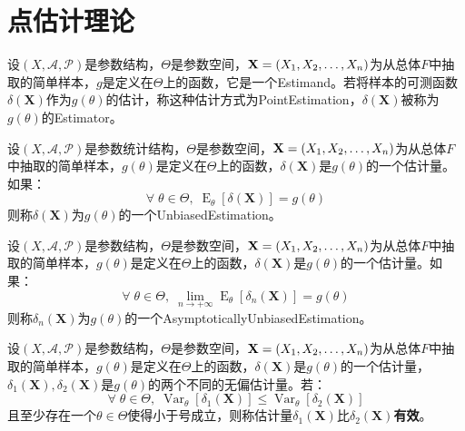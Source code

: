 \chapter{点估计理论}

\begin{definition}
	设$(X,\mathscr{A},\mathscr{P})$是参数结构，$\Theta$是参数空间，$\mathbf{X}=(X_1, X_2, \dots, X_{n})$为从总体$F$中抽取的简单样本，$g$是定义在$\Theta$上的函数，它是一个\gls{Estimand}。若将样本的可测函数$\delta(\mathbf{X})$作为$g(\theta)$的估计，称这种估计方式为\gls{PointEstimation}，$\delta(\mathbf{X})$被称为$g(\theta)$的\gls{Estimator}。
\end{definition}
\begin{definition}
	设$(X,\mathscr{A},\mathscr{P})$是参数统计结构，$\Theta$是参数空间，$\mathbf{X}=(X_1, X_2, \dots, X_{n})$为从总体$F$中抽取的简单样本，$g(\theta)$是定义在$\Theta$上的函数，$\delta(\mathbf{X})$是$g(\theta)$的一个估计量。如果：
	\begin{equation*}
		\forall\;\theta\in\Theta,\;\operatorname{E}_{\theta}[\delta(\mathbf{X})]=g(\theta)
	\end{equation*}
	则称$\delta(\mathbf{X})$为$g(\theta)$的一个\gls{UnbiasedEstimation}。
\end{definition}
\begin{definition}
	设$(X,\mathscr{A},\mathscr{P})$是参数结构，$\Theta$是参数空间，$\mathbf{X}=(X_1, X_2, \dots, X_{n})$为从总体$F$中抽取的简单样本，$g(\theta)$是定义在$\Theta$上的函数，$\delta(\mathbf{X})$是$g(\theta)$的一个估计量。如果：
	\begin{equation*}
		\forall\;\theta\in\Theta,\;\lim_{n\to+\infty}\operatorname{E}_{\theta}[\delta_n(\mathbf{X})]=g(\theta)
	\end{equation*}
	则称$\delta_n(\mathbf{X})$为$g(\theta)$的一个\gls{AsymptoticallyUnbiasedEstimation}。
\end{definition}
\begin{definition}
	设$(X,\mathscr{A},\mathscr{P})$是参数结构，$\Theta$是参数空间，$\mathbf{X}=(X_1, X_2, \dots, X_{n})$为从总体$F$中抽取的简单样本，$g(\theta)$是定义在$\Theta$上的函数，$\delta(\mathbf{X})$是$g(\theta)$的一个估计量，$\delta_1(\mathbf{X}),\delta_2(\mathbf{X})$是$g(\theta)$的两个不同的无偏估计量。若：
	\begin{equation*}
		\forall\;\theta\in\Theta,\;\operatorname{Var}_{\theta}[\delta_1(\mathbf{X})]\leqslant\operatorname{Var}_{\theta}[\delta_2(\mathbf{X})]
	\end{equation*}
	且至少存在一个$\theta\in\Theta$使得小于号成立，则称估计量$\delta_1(\mathbf{X})$比$\delta_2(\mathbf{X})$\textbf{有效}。
\end{definition}
